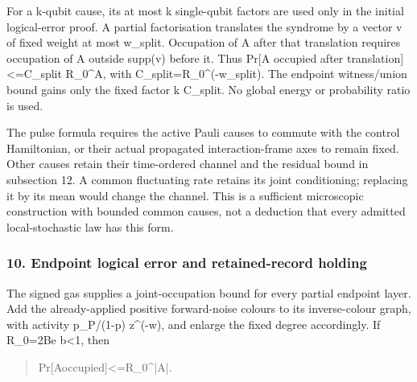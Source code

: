 \documentclass[
]{article}
\begin{document}
For a k-qubit cause, its at most k single-qubit factors are used only in
the initial logical-error proof. A partial factorisation translates the
syndrome by a vector v of fixed weight at most w\_split. Occupation of A
after that translation requires occupation of A outside supp(v) before
it. Thus Pr{[}A occupied after
t\allowbreak{}r\allowbreak{}a\allowbreak{}n\allowbreak{}s\allowbreak{}l\allowbreak{}a\allowbreak{}t\allowbreak{}i\allowbreak{}o\allowbreak{}n\allowbreak{}]\allowbreak{}<\allowbreak{}=\allowbreak{}C\allowbreak{}\_\allowbreak{}s\allowbreak{}p\allowbreak{}l\allowbreak{}i\allowbreak{}t
R\_0\^{}\textbar A\textbar, with
C\allowbreak{}\_\allowbreak{}s\allowbreak{}p\allowbreak{}l\allowbreak{}i\allowbreak{}t\allowbreak{}=\allowbreak{}R\allowbreak{}\_\allowbreak{}0\allowbreak{}\^{}\allowbreak{}(\allowbreak{}-\allowbreak{}w\allowbreak{}\_\allowbreak{}s\allowbreak{}p\allowbreak{}l\allowbreak{}i\allowbreak{}t\allowbreak{})\allowbreak{}.
The endpoint witness/union bound gains only the fixed factor k C\_split.
No global energy or probability ratio is used.

The pulse formula requires the active Pauli causes to commute with the
control Hamiltonian, or their actual propagated interaction-frame axes
to remain fixed. Other causes retain their time-ordered channel and the
residual bound in subsection 12. A common fluctuating rate retains its
joint conditioning; replacing it by its mean would change the channel.
This is a sufficient microscopic construction with bounded common
causes, not a deduction that every admitted local-stochastic law has
this form.

\subsubsection{10. Endpoint logical error and retained-record
holding}\label{endpoint-logical-error-and-retained-record-holding}

The signed gas supplies a joint-occupation bound for every partial
endpoint layer. Add the already-applied positive forward-noise colours
to its inverse-colour graph, with activity p\_P/(1-p) z\^{}(-w), and
enlarge the fixed degree accordingly. If R\_0=2Be b\textless1, then

\begin{quote}\small\ttfamily\raggedright\setlength{\parskip}{0pt}
\noindent P\allowbreak{}r\allowbreak{}[\allowbreak{}A\allowbreak{}\hspace*{0.525em}\allowbreak{}o\allowbreak{}c\allowbreak{}c\allowbreak{}u\allowbreak{}p\allowbreak{}i\allowbreak{}e\allowbreak{}d\allowbreak{}]\allowbreak{}<\allowbreak{}=\allowbreak{}R\allowbreak{}\_\allowbreak{}0\allowbreak{}\^{}\allowbreak{}|\allowbreak{}A\allowbreak{}|\allowbreak{}.\par
\end{quote}
\end{document}
